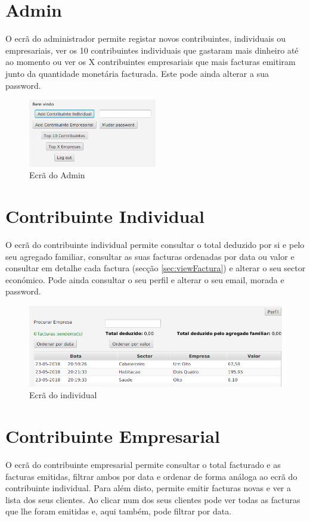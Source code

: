 \documentclass[12pt,a4paper]{report}
\begin{document}
    \section{Admin}
    O ecrã do administrador permite registar novos contribuintes, individuais
    ou empresariais, ver os 10 contribuintes individuais que gastaram mais
    dinheiro até ao momento ou ver os X contribuintes empresariais que mais
    facturas emitiram junto da quantidade monetária facturada.
    Este pode ainda alterar a sua password.
\begin{figure}[h]
    \centering
    \includegraphics[width=0.5\textwidth]{./images/AdminScreen.png}
    \caption{Ecrã do Admin}
    \label{fig:admin}
\end{figure}

\pagebreak

    \section{Contribuinte Individual}
    O ecrã do contribuinte individual permite consultar o total deduzido por
    si e pelo seu agregado familiar, consultar as suas facturas ordenadas por
    data ou valor e consultar em detalhe cada factura
    (secção \ref{sec:viewFactura}) e alterar o seu sector económico. Pode ainda
    consultar o seu perfil e alterar o seu email, morada e password.

\begin{figure}[h]
    \centering
    \includegraphics[width=\textwidth]{./images/IndividualScreen.png}
    \caption{Ecrã do individual}
    \label{fig:individual}
\end{figure}

    \section{Contribuinte Empresarial}
    O ecrã do contribuinte empresarial permite consultar o total facturado
    e as facturas emitidas, filtrar ambos por data e ordenar de
    forma análoga ao ecrã do contribuinte individual. Para além disto, permite
    emitir facturas novas e ver a lista dos seus clientes. Ao clicar num dos seus
    clientes pode ver todas as facturas que lhe foram emitidas e, aqui
    também, pode filtrar por data.
\end{document}
